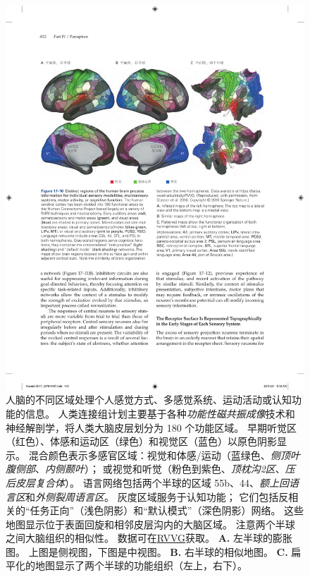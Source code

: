 \begin{figure}[htbp]
	\centering
	\includegraphics[width=1.0\linewidth]{chap17/fig_17_10}
	\caption{人脑的不同区域处理个人感觉方式、多感觉系统、运动活动或认知功能的信息。
		人类连接组计划主要基于各种\textit{功能性磁共振成像}技术和神经解剖学，将人类大脑皮层划分为 180 个功能区域。
		早期听觉区（红色）、体感和运动区（绿色）和视觉区（蓝色）以原色阴影显示。
		混合颜色表示多感官区域：视觉和体感/运动（蓝绿色、\textit{侧顶叶腹侧部}、\textit{内侧颞叶}）；
		或视觉和听觉（粉色到紫色、\textit{顶枕沟2区}、\textit{压后皮层复合体}）。
		语言网络包括两个半球的区域 55b、44、\textit{额上回语言区}和\textit{外侧裂周语言区}。
		灰度区域服务于认知功能； 它们包括反相关的“任务正向”（浅色阴影）和“默认模式”（深色阴影）网络。 
		这些地图显示位于表面回旋和相邻皮层沟内的大脑区域。
		注意两个半球之间大脑组织的相似性\cite{glasser2016multi}。
		数据可在\href{https://balsa.wustl.edu/study/RVVG}{RVVG}获取。
		\textbf{A.} 左半球的膨胀图。 上图是侧视图，下图是中视图。
		\textbf{B.} 右半球的相似地图。 
		\textbf{C.} 扁平化的地图显示了两个半球的功能组织（左上，右下）。}
	\label{fig:17_10}
\end{figure}


